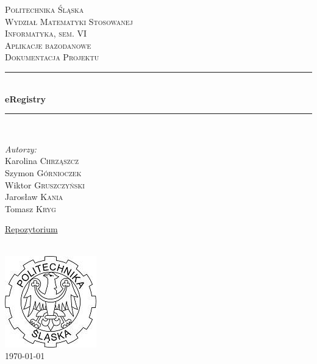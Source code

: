 \documentclass[12pt, titlepage]{article}
\begin{document}
\begin{titlepage}

\newcommand{\HRule}{\rule{\linewidth}{0.5mm}} %

\center 

\textsc{\LARGE Politechnika Śląska}\\[1.2cm] 

\textsc{\Large Wydział Matematyki Stosowanej}\\ 
\textsc{\Large Informatyka, sem. VI}\\[0.8cm]

\textsc{\large Aplikacje bazodanowe}\\
\textsc{\large Dokumentacja Projektu}\\[0.7cm] 


\HRule \\[0.7cm]
{ \huge \bfseries eRegistry}\\[0.4cm] 
\HRule \\[0.7cm]
 
\begin{minipage}{0.8\textwidth}
\begin{flushleft} \large
\emph{Autorzy:}\\
Karolina \textsc{Chrząszcz}\\
Szymon \textsc{Górnioczek}\\
Wiktor \textsc{Gruszczyński}\\
Jarosław \textsc{Kania}\\
Tomasz \textsc{Kryg}\\
\end{flushleft}

\begin{flushright}
\href{http://github.com/szymongor/eRegistry}{Repozytorium}
\end{flushright} \large

\end{minipage}\\[0.7cm]

\includegraphics[scale=0.5]{img/logo.jpg}\\[1cm]
{\large \today}\\[0.5cm] 

\vfill %

\end{titlepage}
\end{document}
